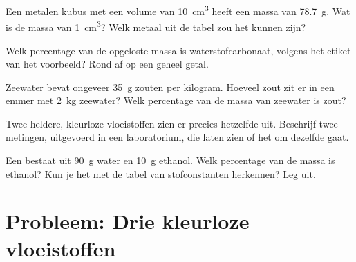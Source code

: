 \begin{exercise}[$\star\star$]\label{exo:g6:pure-substances-and-mixtures:8}
Een metalen kubus met een volume van \qty{10}{cm^3} heeft een massa van
\qty{78.7}{g}. Wat is de massa van \qty{1}{cm^3}? Welk metaal uit de
tabel zou het kunnen zijn?
\end{exercise}

\begin{exercise}[$\star\star$]\label{exo:g6:pure-substances-and-mixtures:9}
Welk percentage van de opgeloste massa is waterstofcarbonaat, volgens het
etiket van het voorbeeld? Rond af op een geheel getal.
\end{exercise}

\begin{exercise}[$\star\star$]\label{exo:g6:pure-substances-and-mixtures:10}
Zeewater bevat ongeveer \qty{35}{g} zouten per kilogram. Hoeveel zout zit
er in een emmer met \qty{2}{kg} zeewater? Welk percentage van de massa
van zeewater is zout?
\end{exercise}

\begin{exercise}[$\star\star\star$]\label{exo:g6:pure-substances-and-mixtures:11}
Twee heldere, kleurloze vloeistoffen zien er precies hetzelfde uit.
Beschrijf twee metingen, uitgevoerd in een laboratorium, die laten zien
of het om dezelfde  gaat.
\end{exercise}

\begin{exercise}[$\star\star\star$]\label{exo:g6:pure-substances-and-mixtures:12}
Een  bestaat uit \qty{90}{g} water en \qty{10}{g} ethanol. Welk
percentage van de massa is ethanol? Kun je het met de tabel van
stofconstanten herkennen? Leg uit.
\end{exercise}

\section{Probleem: Drie kleurloze vloeistoffen}

